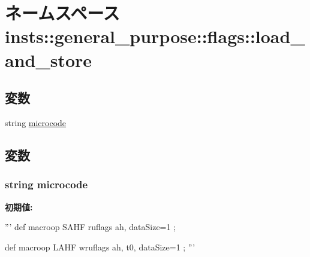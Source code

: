\hypertarget{namespaceinsts_1_1general__purpose_1_1flags_1_1load__and__store}{
\section{ネームスペース insts::general\_\-purpose::flags::load\_\-and\_\-store}
\label{namespaceinsts_1_1general__purpose_1_1flags_1_1load__and__store}
}
\subsection*{変数}
\begin{DoxyCompactItemize}
\item 
string \hyperlink{namespaceinsts_1_1general__purpose_1_1flags_1_1load__and__store_a770f11a173e99389a8802f0107ed8f52}{microcode}
\end{DoxyCompactItemize}


\subsection{変数}
\hypertarget{namespaceinsts_1_1general__purpose_1_1flags_1_1load__and__store_a770f11a173e99389a8802f0107ed8f52}{
\subsubsection[{microcode}]{\setlength{\rightskip}{0pt plus 5cm}string {\bf microcode}}}
\label{namespaceinsts_1_1general__purpose_1_1flags_1_1load__and__store_a770f11a173e99389a8802f0107ed8f52}
{\bfseries 初期値:}
\begin{DoxyCode}
'''
def macroop SAHF {
    ruflags ah, dataSize=1
};

def macroop LAHF {
    wruflags ah, t0, dataSize=1
};
'''
\end{DoxyCode}

